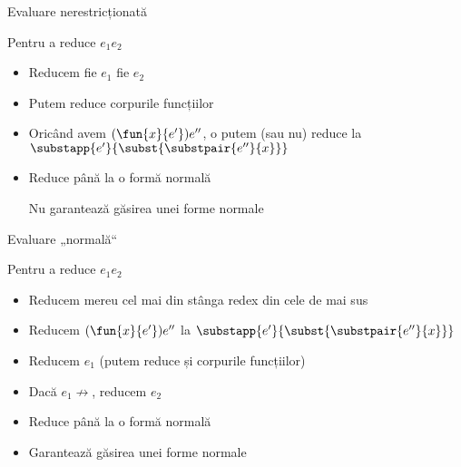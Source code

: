 \documentclass[xcolor=pdftex,romanian,colorlinks]{beamer}
\begin{document}
\begin{frame}{Evaluare nerestricționată}
\begin{block}{}
Pentru a reduce $e_1 \mathrel{} e_2$
\begin{itemize}
\item Reducem fie $e_1$ fie $e_2$
\item Putem reduce corpurile funcțiilor
\item Oricând avem  $(\fun{x}{e'}) e''$, o putem (sau nu)
reduce la $\substapp{e'}{\subst{\substpair{e''}{x}}}$
\item Reduce până la o formă normală
\item[Nu] garantează găsirea unei forme normale
\end{itemize} 
\end{block}
\end{frame}

\begin{frame}{Evaluare „normală“}
\begin{block}{}
Pentru a reduce $e_1 \mathrel{} e_2$
\begin{itemize}
\item Reducem mereu cel mai din stânga redex din cele de mai sus
\item Reducem $(\fun{x}{e'}) e''$ la $\substapp{e'}{\subst{\substpair{e''}{x}}}$
\item Reducem $e_1$ (putem reduce și corpurile funcțiilor)
\item Dacă $e_1\not\rightarrow$, reducem $e_2$
\item Reduce până la o formă normală
\item Garantează găsirea unei forme normale
\end{itemize} 
\end{block}

\end{frame}
\end{document}
